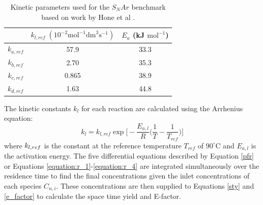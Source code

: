 \begin{table}[tb]
  \centering
  \caption{Kinetic parameters used for the $S_NAr$ benchmark based on work by Hone et al \cite{Hone2017}.}
  \begin{tabular}{ccc}
    &$k_{l,ref} \; (10^{-2} \text{mol}^{-1} \text{dm}^3 \text{s}^{-1})$ & $E_a$ (kJ $\text{mol}^{-1}$) \\
    \hline
    $k_{a,ref}$ & 57.9 & 33.3  \\
    $k_{b,ref}$ & 2.70 & 35.3  \\
    $k_{c,ref}$ & 0.865 & 38.9 \\
    $k_{d,ref}$ & 1.63 & 44.8 \\
  \end{tabular}
  
  \label{table:snar_parameters}
\end{table}

The kinetic constants $k_l$ for each reaction are calculated using the Arrhenius equation:
\begin{equation}
	k_l = k_{l, ref} \exp\Biggl[-\frac{E_{a,l}}{R}\biggl(\frac{1}{T}-\frac{1}{T_{ref}}\biggr)\Biggr]
\end{equation}
where $k_{l, \\ref}$ is the constant at the reference temperature $T_{ref}$ of $90^{\circ}$C and $E_{a,l}$ is the activation energy. The five differential equations described by Equation \ref{pfr} or Equations \ref{equation:r_1}-\ref{equation:r_4}  are integrated simultaneously over the residence time to find the final concentrations given the inlet concentrations of each species $C_{n,i}$. These concentrations are then supplied to Equations \ref{sty} and \ref{e_factor} to calculate the space time yield and E-factor.




